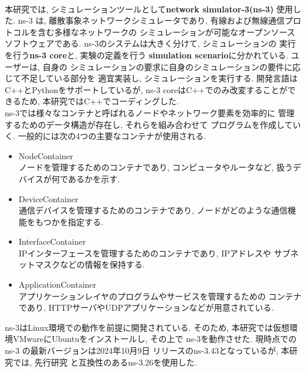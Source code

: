 \\[1em]
\indent 本研究では, シミュレーションツールとして\textbf{network simulator-3(ns-3)}
\cite{ns-3}使用した. ns-3 は, 離散事象ネットワークシミュレータであり, 
有線および無線通信プロトコルを含む多様なネットワークの
シミュレーションが可能なオープンソースソフトウェアである. 
ns-3のシステムは大きく分けて, シミュレーションの
実行を行う\textbf{ns-3 core}と, 実験の定義を行う
\textbf{simulation scenario}に分かれている. ユーザーは, 自身の
シミュレーションの要求に自身のシミュレーションの要件に応じて不足している部分を
適宜実装し, シミュレーションを実行する. 開発言語はC++とPythonをサポートしているが, 
ns-3 coreはC++でのみ改変することができるため, 本研究ではC++でコーディングした.\\
\indent ns-3では様々なコンテナと呼ばれるノードやネットワーク要素を効率的に
管理するためのデータ構造が存在し, それらを組み合わせて
プログラムを作成していく. 一般的には次の4つの主要なコンテナが使用される.
\begin{itemize}
  \item NodeContainer\\ 
  \indent ノードを管理するためのコンテナであり, 
  コンピュータやルータなど, 扱うデバイスが何であるかを示す. 
  \item DeviceContainer\\
  \indent 通信デバイスを管理するためのコンテナであり, 
  ノードがどのような通信機能をもつかを指定する. 
  \item InterfaceContainer\\
  \indent IPインターフェースを管理するためのコンテナであり, IPアドレスや
  サブネットマスクなどの情報を保持する.
  \item ApplicationContainer\\
  \indent アプリケーションレイヤのプログラムやサービスを管理するための
  コンテナであり, HTTPサーバやUDPアプリケーションなどが用意されている.
\end{itemize}

ns-3はLinux環境での動作を前提に開発されている. そのため, 
本研究では仮想環境VMwareにUbuntuをインストールし, その上で
ns-3を動作させた. 現時点での ns-3 の最新バージョンは2024年10月9日
リリースのns-3.43となっているが, 本研究では, 先行研究
\cite{shinato}と互換性のあるns-3.26を使用した. \\[1em]


 
